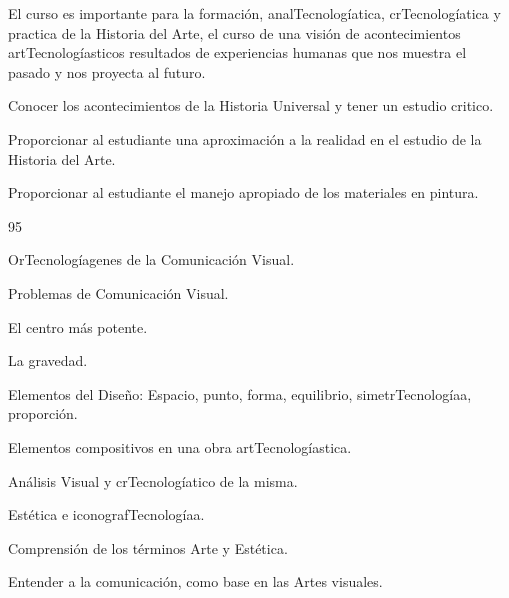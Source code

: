 \begin{syllabus}


\begin{justification}
El curso es importante para la formación, analTecnologíatica, crTecnologíatica y practica de la Historia del Arte, el curso de una visión de acontecimientos artTecnologíasticos resultados de experiencias humanas que nos muestra el pasado y nos proyecta al futuro.
\end{justification}

\begin{goals}
\item Conocer los acontecimientos de la Historia Universal y tener un estudio critico.
\item Proporcionar al estudiante una aproximación a la realidad en el estudio de la Historia del Arte.
\item Proporcionar al estudiante el manejo apropiado de los materiales en pintura.
\end{goals}

\begin{outcomes}
\end{outcomes}

\begin{unit}{}{}{9}{5}
\begin{topics}
	\item OrTecnologíagenes de la Comunicación Visual.
	\item Problemas de Comunicación Visual.
	\item El centro más potente.
	\item La gravedad.
	\item Elementos del Diseño: Espacio, punto, forma, equilibrio, simetrTecnologíaa, proporción.
	\item Elementos compositivos en una obra artTecnologíastica.
	\item Análisis Visual y crTecnologíatico de la misma.
	\item Estética e iconografTecnologíaa.
\end{topics}
\begin{learningoutcomes}
	\item Comprensión de los términos Arte y Estética.
	\item Entender a la comunicación, como base en las Artes visuales.

\end{learningoutcomes}
\end{unit}


\end{syllabus}
